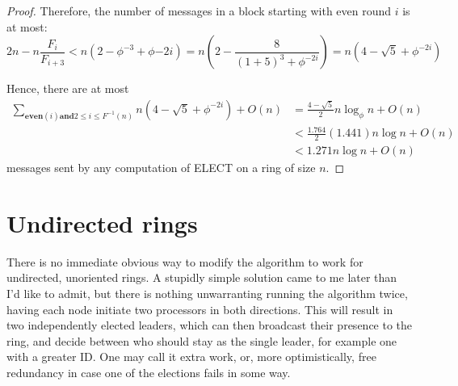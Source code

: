 \documentclass{article}
\begin{document}
\begin{proof}
    Therefore, the number of messages in a block starting with even round $i$ is at most:
    \[
        2n - n\frac{F_i}{F_{i+3}} < n(2 - \phi^{-3} + \phi{-2i}) = n \left( 2-\frac{8}{(1+5)^3 + \phi^{-2i}} \right) = n(4-\sqrt{5}+\phi^{-2i})
    \]

    Hence, there are at most
    \[
    \begin{aligned}
        \sum_{\textbf{even}(i) \textbf{and} 2\leq i \leq F^{-1}(n)} 
            n(4-\sqrt{5}+\phi^{-2i}) + O(n)
        & = \frac{4 - \sqrt{5}}{2}n\log_{\phi}n + O(n) \\
        & < \frac{1.764}{2}(1.441)n\log n + O(n) \\
        & < 1.271n\log n + O(n)
    \end{aligned}
    \]
    messages sent by any computation of ELECT on a ring of size $n$.
\end{proof}

\section{Undirected rings}

\textnormal{There is no immediate obvious way to modify the algorithm to work for undirected, unoriented rings. A stupidly simple solution came to me later than I'd like to admit, but there is nothing unwarranting running the algorithm twice, having each node initiate two processors in both directions. This will result in two independently elected leaders, which can then broadcast their presence to the ring, and decide between who should stay as the single leader, for example one with a greater ID. One may call it extra work, or, more optimistically, free redundancy in case one of the elections fails in some way.}
\end{document}
